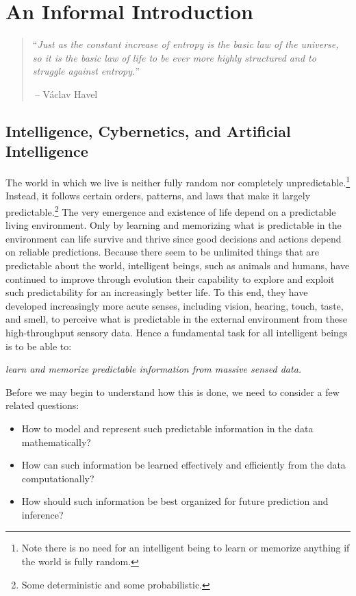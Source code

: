 \documentclass[../../book-main.tex]{subfiles}
\begin{document}
\chapter{An Informal Introduction}
\label{ch:intro}

\begin{quote}
``{\em Just as the constant increase of entropy is the basic law of the universe, so it is the basic law of life to be ever more highly structured and to struggle against entropy.}''

$~$\hfill -- V\'{a}clav Havel
 \end{quote}
\vspace{5mm}



\section{Intelligence, Cybernetics, and Artificial Intelligence}
The world in which we live is neither fully random nor completely unpredictable.\footnote{Note there is no need for an intelligent being to learn or memorize anything if the world is fully random.} Instead, it follows certain orders, patterns, and laws that make it largely predictable.\footnote{Some deterministic and some probabilistic.} The very emergence and existence of life depend on a predictable living environment. Only by learning and memorizing what is predictable in the environment can life survive and thrive since good decisions and actions depend on reliable predictions. Because there seem to be unlimited things that are predictable about the world, intelligent beings, such as animals and humans, have continued to improve through evolution their capability to explore and exploit such predictability for an increasingly better life. To this end, they have developed increasingly more acute senses, including vision, hearing, touch, taste, and smell, to perceive what is predictable in the external environment from these high-throughput sensory data. Hence a fundamental task for all intelligent beings is to be able to:
\begin{center}
    {\em learn and memorize predictable information from massive sensed data.}
\end{center}
Before we may begin to understand how this is done, we need to consider a few related questions:
\begin{itemize}
    \item How to model and represent such predictable information in the data mathematically?
    \item How can such information be learned effectively and efficiently from the data computationally?
    \item How should such information be best organized for future prediction and inference?
\end{itemize}
\end{document}
